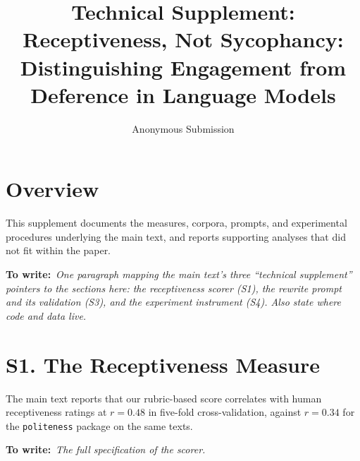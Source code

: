 \documentclass[letterpaper]{article} %
\title{Technical Supplement:\\Receptiveness, Not Sycophancy: Distinguishing Engagement from Deference in Language Models}
\author{
    Anonymous Submission
}
\newcommand{\needs}[1]{%
  \par\smallskip\noindent\textbf{To write:}\ \textit{#1}\par\smallskip}
\begin{document}
\maketitle

\section{Overview}

This supplement documents the measures, corpora, prompts, and experimental
procedures underlying the main text, and reports supporting analyses that did
not fit within the paper.

\needs{One paragraph mapping the main text's three ``technical supplement''
pointers to the sections here: the receptiveness scorer (S1), the rewrite
prompt and its validation (S3), and the experiment instrument (S4). Also state
where code and data live.}

\section{S1. The Receptiveness Measure}

The main text reports that our rubric-based score correlates with human
receptiveness ratings at $r = 0.48$ in five-fold cross-validation, against
$r = 0.34$ for the \texttt{politeness} package on the same texts.

\needs{The full specification of the scorer.}
\end{document}
